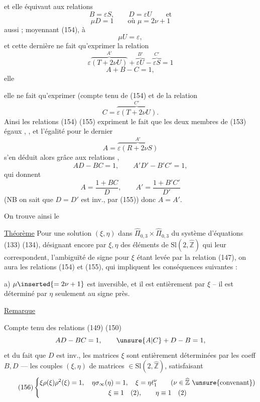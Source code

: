 
et elle équivaut aux relations
\[
\tag{154}
B=\varepsilon S,\qquad D=\varepsilon U\qquad\text{et}
\]
\[
\tag{155}
\mu D=1\qquad\text{où }\mu=2\nu+1
\]
 aussi ; moyennant (154), à
\[
\tag{155bis}
\mu U=\varepsilon,
\]
et cette dernière ne fait qu'exprimer  la relation
\[
\varepsilon\overbrace{(T+2\nu U)}^{A'}
+\overbrace{\varepsilon U}^{B'}-\overbrace{\varepsilon S}^{C'}=1
\]
\[
A+B-C=1,
\]
elle


elle ne fait qu'exprimer (compte tenu de (154) et de  la relation
\[
C=\overbrace{\varepsilon(T+2\nu U)}^{C'}.
\]
Ainsi les relations (154) (155) expriment le fait que les deux membres de (153)   égaux  , , et l'égalité pour le dernier
\[
A=\overbrace{\varepsilon(R+2\nu S)}^{A'}
\]
s'en déduit alors grâce aux relations , 
\[
AD-BC=1,\qquad A'D'-B'C'=1,
\]
qui donnent
\[
A=\frac{1+BC}{D},\qquad A'=\frac{1+B'C'}{D'}
\]
(NB on sait que $D=D'$ est inv., par (155)) donc $A=A'$.

On trouve ainsi le

\uline{Théorème} Pour une solution $(\xi,\eta)$ dans $\widehat{\Pi}_{0,3}\times\widehat{\Pi}_{0,3}$ du système d'équations (133) (134), désignant encore par $\xi,\eta$ des éléments de $\mathrm{Sl}(2,\widehat{\mathbb Z})$ qui leur correspondent, l'ambiguïté de signe pour $\xi$ étant levée par la relation (147), on aura les relations (154) et (155), qui impliquent les conséquences suivantes :

a) $\mu\inserted{=2\nu+1}$ est inversible, et il est entièrement  par $\xi$ -- il est déterminé par $\eta$ seulement au signe près.


\uline{Remarque}

Compte tenu des relations (149) (150)
\[
AD-BC=1,\qquad \unsure{A|C}+D-B=1,
\]
et du fait que $D$ est inv., les matrices $\xi$ sont entièrement déterminées par les coeff $B,D$ --- les couples $(\xi,\eta)$ de matrices $\in\mathrm{Sl}(2,\widehat{\mathbb Z})$, satisfaisant
\[
\tag{156}
\left\{\begin{gathered}
\xi\rho(\xi)\rho^2(\xi)=1,\quad
\eta\sigma_\infty(\eta)=1,\quad
\xi=\eta\ell_1^\nu
\qquad(\nu\in\widehat{\mathbb Z}\ \text{\unsure{convenant}})\\
\xi\equiv1\quad(2),\qquad\eta\equiv1\quad(2)
\end{gathered}\right.
\]

